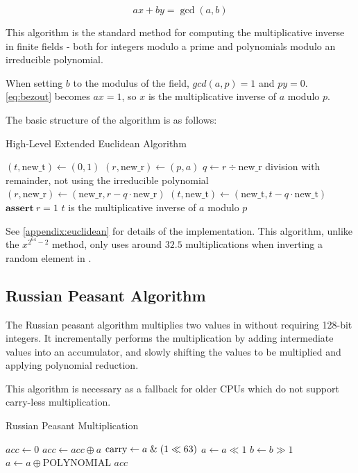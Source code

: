 \begin{equation}
ax + by = \gcd(a, b) \label{eq:bezout}
\end{equation}

This algorithm is the standard method for computing the multiplicative inverse in finite fields - both for integers modulo a prime and polynomials modulo an irreducible polynomial.

When setting $b$ to the modulus of the field, $gcd(a, p) = 1$ and $py = 0$. \ref{eq:bezout} becomes $ax = 1$, so $x$ is the multiplicative inverse of $a$ modulo $p$.

The basic structure of the algorithm is as follows:

\begin{algorithm}
    \caption{High-Level Extended Euclidean Algorithm}
    \begin{algorithmic}
        \State $(t, \text{new\_t}) \gets (0, 1)$
        \State $(r, \text{new\_r}) \gets (p, a)$
            \State $q \gets r \div \text{new\_r}$ \Comment division with remainder, not using the irreducible polynomial
            \State $(r, \text{new\_r}) \gets (\text{new\_r}, r - q \cdot \text{new\_r})$
            \State $(t, \text{new\_t}) \gets (\text{new\_t}, t - q \cdot \text{new\_t})$
        \EndWhile
        \State $\textbf{assert}\ r = 1$
        \Comment $t$ is the multiplicative inverse of $a$ modulo $p$
    \end{algorithmic}
\end{algorithm}

See \ref{appendix:euclidean} for details of the implementation.
This algorithm, unlike the $x^{2^{64} - 2}$ method, only uses around $32.5$ multiplications when inverting a random element in .

\subsection{Russian Peasant Algorithm}

The Russian peasant algorithm multiplies two values in  without requiring 128-bit integers.
It incrementally performs the multiplication by adding intermediate values into an accumulator, and slowly shifting the values to be multiplied and applying polynomial reduction.

This algorithm is necessary as a fallback for older CPUs which do not support carry-less multiplication.

\begin{algorithm}
\caption{Russian Peasant Multiplication}
\begin{algorithmic}
\State $acc \gets 0$
        \State $acc \gets acc \oplus a$
    \EndIf
    \State $\text{carry} \gets a \;\&\; (1 \ll 63)$
    \State $a \gets a \ll 1$
    \State $b \gets b \gg 1$
        \State $a \gets a \oplus \text{POLYNOMIAL}$ 
    \EndIf
\EndFor
\State \Return $acc$
\EndFunction
\end{algorithmic}
\end{algorithm}
